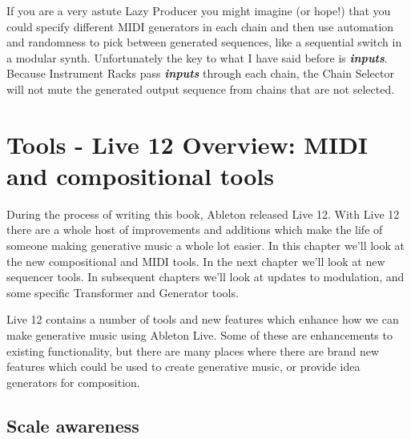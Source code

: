 \documentclass[
  12pt,
  letterpaper,
  oneside,
  open=any]{scrbook}
\begin{document}
If you are a very astute Lazy Producer you might imagine (or hope!) that
you could specify different MIDI generators in each chain and then use
automation and randomness to pick between generated sequences, like a
sequential switch in a modular synth. Unfortunately the key to what I
have said before is \textbf{\emph{inputs}}. Because Instrument Racks
pass \textbf{\emph{inputs}} through each chain, the Chain Selector will
not mute the generated output sequence from chains that are not
selected.


\chapter{Tools - Live 12 Overview: MIDI and compositional
tools}\label{Chapter-030-Tools-Live12_Intro}

During the process of writing this book, Ableton released Live 12. With
Live 12 there are a whole host of improvements and additions which make
the life of someone making generative music a whole lot easier. In this
chapter we'll look at the new compositional and MIDI tools. In the next
chapter we'll look at new sequencer tools. In subsequent chapters we'll
look at updates to modulation, and some specific Transformer and
Generator tools.

\begin{tcolorbox}[enhanced jigsaw, arc=.35mm, title=\textcolor{quarto-callout-tip-color}{\faLightbulb}\hspace{0.5em}{Key idea}, colback=white, opacitybacktitle=0.6, coltitle=black, toptitle=1mm, colframe=quarto-callout-tip-color-frame, bottomtitle=1mm, titlerule=0mm, rightrule=.15mm, bottomrule=.15mm, colbacktitle=quarto-callout-tip-color!10!white, toprule=.15mm, breakable, opacityback=0, left=2mm, leftrule=.75mm]

Live 12 contains a number of tools and new features which enhance how we
can make generative music using Ableton Live. Some of these are
enhancements to existing functionality, but there are many places where
there are brand new features which could be used to create generative
music, or provide idea generators for composition.

\end{tcolorbox}

\section{Scale awareness}\label{scale-awareness}
\end{document}
